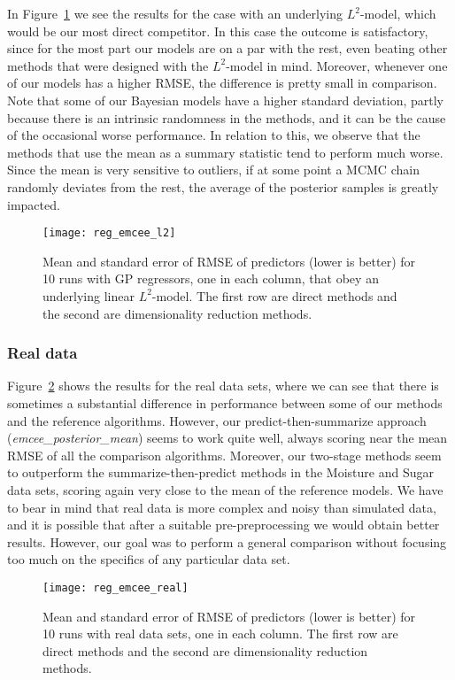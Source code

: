 \documentclass{article}
\numberwithin{equation}{section}
\theoremstyle{plain}
\begin{document}
In Figure~\ref{fig:reg_emcee_l2} we see the results for the case with an underlying \(L^2\)-model, which would be our most direct competitor. In this case the outcome is satisfactory, since for the most part our models are on a par with the rest, even beating other methods that were designed with the \(L^2\)-model in mind. Moreover, whenever one of our models has a higher RMSE, the difference is pretty small in comparison. Note that some of our Bayesian models have a higher standard deviation, partly because there is an intrinsic randomness in the methods, and it can be the cause of the occasional worse performance. In relation to this, we observe that the methods that use the mean as a summary statistic tend to perform much worse. Since the mean is very sensitive to outliers, if at some point a MCMC chain randomly deviates from the rest, the average of the posterior samples is greatly impacted.

\begin{figure}[ht!]
  \centering
  \texttt{[image: reg\_emcee\_l2]}
  \caption{Mean and standard error of RMSE of predictors (lower is better) for 10 runs with GP regressors, one in each column, that obey an underlying linear \(L^2\)-model. The first row are direct methods and the second are dimensionality reduction methods.}\label{fig:reg_emcee_l2}
\end{figure}

\subsubsection*{Real data}

Figure~\ref{fig:reg_emcee_real} shows the results for the real data sets, where we can see that there is sometimes a substantial difference in performance between some of our methods and the reference algorithms. However, our predict-then-summarize approach (\textit{emcee\_posterior\_mean}) seems to work quite well, always scoring near the mean RMSE of all the comparison algorithms. Moreover, our two-stage methods seem to outperform the summarize-then-predict methods in the Moisture and Sugar data sets, scoring again very close to the mean of the reference models. We have to bear in mind that real data is more complex and noisy than simulated data, and it is possible that after a suitable pre-preprocessing we would obtain better results. However, our goal was to perform a general comparison without focusing too much on the specifics of any particular data set.

\begin{figure}[ht!]
  \centering
  \texttt{[image: reg\_emcee\_real]}
  \caption{Mean and standard error of RMSE of predictors (lower is better) for 10 runs with real data sets, one in each column. The first row are direct methods and the second are dimensionality reduction methods.}\label{fig:reg_emcee_real}
\end{figure}
\end{document}
